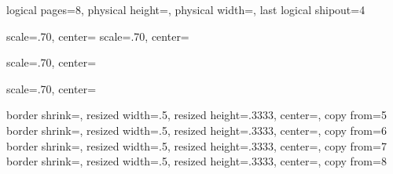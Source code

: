   {
    \edef\pgfpageoptionheight{\the\paperheight}
    \edef\pgfpageoptionwidth{\the\paperwidth}
    \edef\pgfpageoptionborder{0pt}
 }
 {
    \pgfpagesphysicalpageoptions
    {%
      logical pages=8,%
      physical height=\pgfpageoptionheight,%
      physical width=\pgfpageoptionwidth,%
      last logical shipout=4%
    }
    
        {%
                scale=.70,
                center=\pgfpoint{.25\pgfphysicalwidth}{.875\pgfphysicalheight}%
        }%
        {%
                scale=.70,
                center=\pgfpoint{.25\pgfphysicalwidth}{.625\pgfphysicalheight}%
        }%

        {%
                scale=.70,
                center=\pgfpoint{.25\pgfphysicalwidth}{.375\pgfphysicalheight}%
        }%

        {%
                scale=.70,
                center=\pgfpoint{.25\pgfphysicalwidth}{.125\pgfphysicalheight}%
        }%
	
	
	
	
	
	
	
	
    {%
      border shrink=\pgfpageoptionborder,%
      resized width=.5\pgfphysicalwidth,%
      resized height=.3333\pgfphysicalheight,%
      center=\pgfpoint{.75\pgfphysicalwidth}{.875\pgfphysicalheight},%
      copy from=5
    }%
    {%
      border shrink=\pgfpageoptionborder,%
      resized width=.5\pgfphysicalwidth,%
      resized height=.3333\pgfphysicalheight,%
      center=\pgfpoint{.75\pgfphysicalwidth}{.625\pgfphysicalheight},%
      copy from=6
    }%
    {%
      border shrink=\pgfpageoptionborder,%
      resized width=.5\pgfphysicalwidth,%
      resized height=.3333\pgfphysicalheight,%
      center=\pgfpoint{.75\pgfphysicalwidth}{.375\pgfphysicalheight},%
      copy from=7
    }%
    {%
      border shrink=\pgfpageoptionborder,%
      resized width=.5\pgfphysicalwidth,%
      resized height=.3333\pgfphysicalheight,%
      center=\pgfpoint{.75\pgfphysicalwidth}{.125\pgfphysicalheight},%
      copy from=8
    }%
 }



